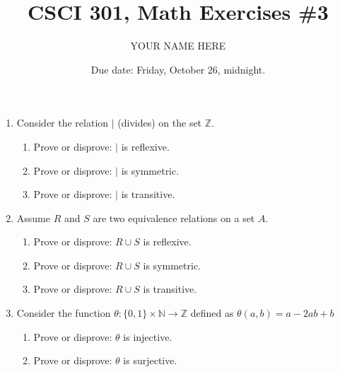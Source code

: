 \documentclass{article}
\title{CSCI 301, Math Exercises \#3}
\author{YOUR NAME HERE}
\date{Due date:  Friday, October 26, midnight.}
\begin{document}
\maketitle

\begin{enumerate}

\item Consider the relation $\mid$ (divides) on the set $\mathbb{Z}$.
  \begin{enumerate}
  \item Prove or disprove: $\mid$ is reflexive.
  \item Prove or disprove: $\mid$ is symmetric.
  \item Prove or disprove: $\mid$ is transitive.
  \end{enumerate}

\item Assume $R$ and $S$ are two equivalence relations on a
  set $A$.
  \begin{enumerate}
  \item Prove or disprove: $R\cup S$ is reflexive.
  \item Prove or disprove: $R\cup S$ is symmetric.
  \item Prove or disprove: $R\cup S$ is transitive.
  \end{enumerate}

\item Consider the function
  $\theta : \{0,1\}\times\mathbb{N} \rightarrow \mathbb{Z}$
  defined as  $\theta(a,b) = a -2ab + b$

    \begin{enumerate}
    \item     Prove or disprove: $\theta$ is injective.
      \item     Prove or disprove: $\theta$ is surjective.
    \end{enumerate}

\end{enumerate}
\end{document}
